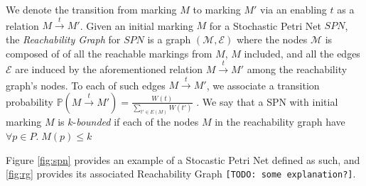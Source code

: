 We denote the transition from marking $M$ to marking $M'$ via an enabling $t$ as a relation $M\overset{t}{\to}M'$. Given an initial marking $M$ for a Stochastic Petri Net $SPN$,  the \textit{Reachability Graph} for $SPN$ is a graph $(\mathcal{M},\mathcal{E})$ where the nodes  $\mathcal{M}$ is composed of of all the reachable markings from $M$, $M$ included, and all the edges $\mathcal{E}$ are induced by the aforementioned relation $M\overset{t}{\to}M'$ among the reachability graph's nodes. To each of such edges $M\overset{t}{\to}M'$, we associate a transition probability $\mathbb{P}\left(M\overset{t}{\to}M'\right)=\frac{W(t)}{\sum_{t'\in E(M)}W(t')}$ \cite{spdwe}. We say that a SPN with initial marking $M$ is $k$-\textit{bounded} if each of the nodes $M$ in the reachability graph have $\forall p\in P.\; M(p)\leq k$\\


\begin{example}
Figure \ref{fig:spn} provides an example of a Stocastic Petri Net defined as such, and \ref{fig:rg} provides its associated Reachability Graph \texttt{[TODO: some explanation?]}.
\end{example}


